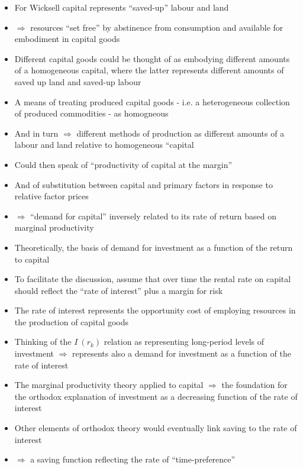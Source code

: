 \documentclass{article}
\begin{document}
\begin{itemize}
		\item For Wicksell capital represents ``saved-up'' labour and land
		\item \( \Rightarrow \) resources ``set free'' by abstinence from consumption and available for embodiment in capital goods
		\item Different capital goods could be thought of as embodying different amounts of a homogeneous capital, where the latter represents different amounts of saved up land and saved-up labour
		\item A means of treating produced capital goods - i.e. a heterogeneous collection of produced commodities  - as homogneous
		\item And in turn \( \Rightarrow \) different methods of production as different amounts of a labour and land relative to homogeneous ``capital
		\item Could then speak of ``productivity of capital at the margin''
		\item And of substitution between capital and primary factors in response to relative factor prices
		\item \( \Rightarrow \) ``demand for capital'' inversely related to its rate of return based on marginal productivity
		\item Theoretically, the basis of demand for investment as a function of the return to capital 
		\item To facilitate the discussion, assume that over time the rental rate on capital should reflect the ``rate of interest'' plus a margin for risk
		\item The rate of interest represents the opportunity cost of employing resources in the production of capital goods
		\item Thinking of the \( I\:(r_k) \) relation as representing long-period levels of investment \( \Rightarrow \) represents also a demand for investment as a function of the rate of interest
		\item The marginal productivity theory applied to capital \( \Rightarrow \) the foundation for the orthodox explanation of investment as a decreasing function of the rate of interest
		\item Other elements of orthodox theory would eventually link saving to the rate of interest
		\item \( \Rightarrow \) a saving function reflecting the rate of ``time-preference''
		\begin{figure}[H]
			\centering
			\begin{tikzpicture}[scale=0.55]

\end{tikzpicture}
\end{figure}
\end{itemize}
\end{document}
